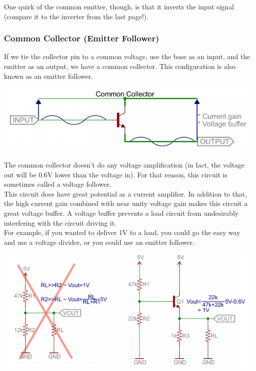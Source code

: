 \documentclass[a4paper, 11pt]{article} %
\begin{document}
One quirk of the common emitter, though, is that it inverts the input signal (compare it to the inverter from the last page!).

\subsubsection*{Common Collector (Emitter Follower)}

If we tie the collector pin to a common voltage, use the base as an input, and the emitter as an output, we have a common collector. This configuration is also known as an emitter follower.

\begin{center}
\includegraphics[width=400pt]{tran24}
\end{center}

The common collector doesn't do any voltage amplification (in fact, the voltage out will be 0.6V lower than the voltage in). For that reason, this circuit is sometimes called a voltage follower.\\

This circuit does have great potential as a current amplifier. In addition to that, the high current gain combined with near unity voltage gain makes this circuit a great voltage buffer. A voltage buffer prevents a load circuit from undesirably interfering with the circuit driving it.\\

For example, if you wanted to deliver 1V to a load, you could go the easy way and use a voltage divider, or you could use an emitter follower.\\

\begin{center}
\includegraphics[width=400pt]{tran25}
\end{center}
\end{document}
